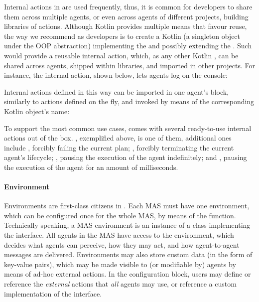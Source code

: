 Internal actions in \jakta{} are used frequently,
thus,
it is common for developers to share them across multiple agents,
or even across agents of different projects,
building libraries of actions.
%
Although Kotlin provides multiple means that favour reuse,
the way we recommend as \jakta{} developers is to create a Kotlin 
(a singleton object under the \ac{OOP} abstraction)
implementing the  
and possibly extending the  .
%
Such  would provide a reusable internal action,
which, as any other Kotlin , can be shared across agents,
shipped within libraries, and imported in other projects.
%
For instance, the  internal action, shown below, lets agents log on the console:
%

%
Internal actions defined in this way can be imported in one agent's  block,
similarly to actions defined on the fly, and invoked
%
by means of the corresponding Kotlin object's name:
%


To support the most common use cases,
\jakta{} comes with several ready-to-use internal actions out of the box.
%
, exemplified above, is one of them,
additional ones include
, forcibly failing the current plan;
, forcibly terminating the current agent's lifecycle;
, pausing the execution of the agent indefinitely;
and , pausing the execution of the agent for an amount of milliseconds.

\paragraph{Environment}

Environments are first-class citizens in \jakta{}.
%
Each \ac{MAS} must have one environment, which can be configured once for the whole \ac{MAS},
by means of the  function.
%
Technically speaking, a \ac{MAS} environment is an instance of a class implementing the  interface.
%
All agents in the \ac{MAS} have access to the environment,
which decides what agents can perceive,
how they may act,
and how agent-to-agent messages are delivered.
%
Environments may also store custom data
(in the form of key-value pairs),
which may be made visible to (or modifiable by) agents
by means of ad-hoc external actions.
%
In the  configuration block,
users may define or reference the \emph{external} actions that \emph{all} agents may use,
or reference a custom implementation of the  interface.

